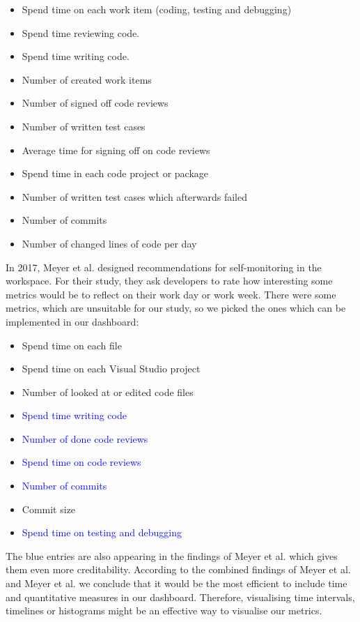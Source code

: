\documentclass{seal_article}
\begin{document}
	\begin{itemize}
		\item Spend time on each work item (coding, testing and debugging)
		\item Spend time reviewing code.
		\item Spend time writing code.
		\item Number of created work items
		\item Number of signed off code reviews
		\item Number of written test cases
		\item Average time for signing off on code reviews
		\item Spend time in each code project or package
		\item Number of written test cases which afterwards failed
		\item Number of commits
		\item Number of changed lines of code per day
	\end{itemize}
	In 2017, Meyer et al. \cite{Meyer:2017:DRS:3171581.3134714} designed recommendations for self-monitoring in the workspace. For their study, they ask developers to rate how interesting some metrics would be to reflect on their work day or work week. There were some metrics, which are unsuitable for our study, so we picked the ones which can be implemented in our dashboard:
	\begin{itemize}
		\item Spend time on each file
		\item Spend time on each Visual Studio project
		\item Number of looked at or edited code files
		\item \textcolor{blue}{Spend time writing code}
		\item \textcolor{blue}{Number of done code reviews}
		\item \textcolor{blue}{Spend time on code reviews}
		\item \textcolor{blue}{Number of commits}
		\item Commit size
		\item \textcolor{blue}{Spend time on testing and debugging}
	\end{itemize}
	The blue entries are also appearing in the findings of Meyer et al. \cite{Meyer:2014:SDP:2635868.2635892} which gives them even more creditability. 
	According to the combined findings of Meyer et al. \cite{Meyer:2014:SDP:2635868.2635892} and Meyer et al. \cite{Meyer:2017:DRS:3171581.3134714} we conclude that it would be the most efficient to include time and quantitative measures in our dashboard. Therefore, visualising time intervals, timelines or histograms might be an effective way to visualise our metrics.\\
	
\end{document}
